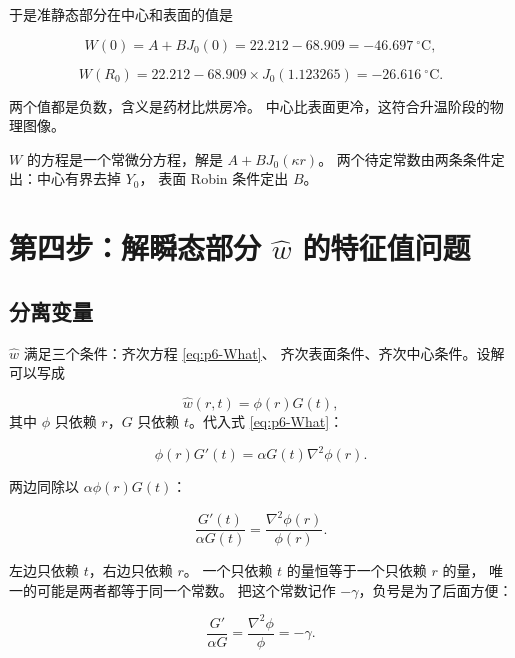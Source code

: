 于是准静态部分在中心和表面的值是

\begin{equation}
W(0)=A+B J_0(0)=22.212-68.909=-46.697\ ^\circ\mathrm{C},
\end{equation}

\begin{equation}
W(R_0)=22.212-68.909\times J_0(1.123265)=-26.616\ ^\circ\mathrm{C}.
\end{equation}

两个值都是负数，含义是药材比烘房冷。
中心比表面更冷，这符合升温阶段的物理图像。

\begin{keypoint}
$W$ 的方程是一个常微分方程，解是 $A+B J_0(\kappa r)$。
两个待定常数由两条条件定出：中心有界去掉 $Y_0$，
表面 Robin 条件定出 $B$。
\end{keypoint}

\section{第四步：解瞬态部分 $\hat w$ 的特征值问题}

\subsection{分离变量}

$\hat w$ 满足三个条件：齐次方程 \eqref{eq:p6-What}、
齐次表面条件、齐次中心条件。设解可以写成

\begin{equation}
\hat w(r,t)=\phi(r)G(t),
\label{eq:p6-sep}
\end{equation}
其中 $\phi$ 只依赖 $r$，$G$ 只依赖 $t$。代入式 \eqref{eq:p6-What}：

\begin{equation}
\phi(r)G'(t)=\alpha G(t)\nabla^2\phi(r).
\end{equation}

两边同除以 $\alpha\phi(r)G(t)$：

\begin{equation}
\frac{G'(t)}{\alpha G(t)}=\frac{\nabla^2\phi(r)}{\phi(r)}.
\label{eq:p6-sep2}
\end{equation}

左边只依赖 $t$，右边只依赖 $r$。
一个只依赖 $t$ 的量恒等于一个只依赖 $r$ 的量，
唯一的可能是两者都等于同一个常数。
把这个常数记作 $-\gamma$，负号是为了后面方便：

\begin{equation}
\frac{G'}{\alpha G}=\frac{\nabla^2\phi}{\phi}=-\gamma .
\end{equation}

